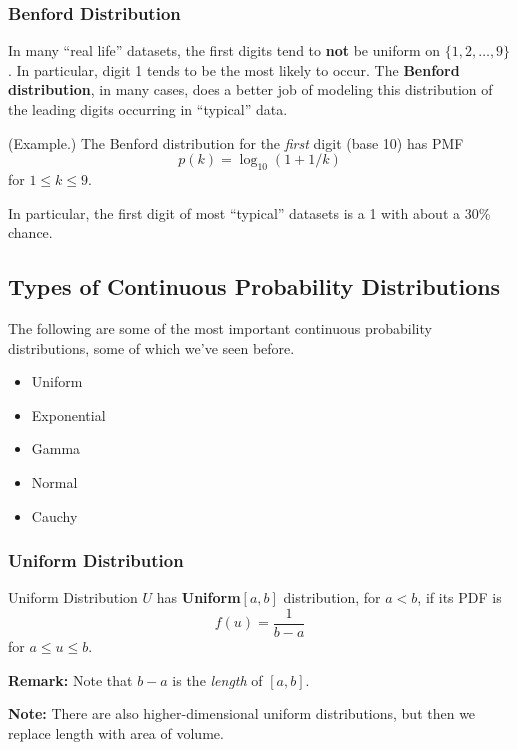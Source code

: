 \subsubsection{Benford Distribution}
In many ``real life'' datasets, the first digits tend to \textbf{not} be uniform on $\{1, 2, \dots, 9\}$. In particular, digit 1 tends to be the most likely to occur. The \textbf{Benford distribution}, in many cases, does a better job of modeling this distribution of the leading digits occurring in ``typical'' data. 

\begin{mdframed}[]
    (Example.) The Benford distribution for the \emph{first} digit (base 10) has PMF 
    \[p(k) = \log_{10}(1 + 1/k)\]
    for $1 \leq k \leq 9$.
\end{mdframed}
In particular, the first digit of most ``typical'' datasets is a 1 with about a 30\% chance. 


\subsection{Types of Continuous Probability Distributions}
The following are some of the most important continuous probability distributions, some of which we've seen before. 
\begin{itemize}
    \item Uniform 
    \item Exponential 
    \item Gamma 
    \item Normal 
    \item Cauchy 
\end{itemize}

\subsubsection{Uniform Distribution}
\begin{definition}{Uniform Distribution}{}
    $U$ has \textbf{Uniform}$[a, b]$ distribution, for $a < b$, if its PDF is 
    \[f(u) = \frac{1}{b - a}\]
    for $a \leq u \leq b$. 
\end{definition}
\textbf{Remark:} Note that $b - a$ is the \emph{length} of $[a, b]$. 

\textbf{Note:} There are also higher-dimensional uniform distributions, but then we replace length with area of volume. 

